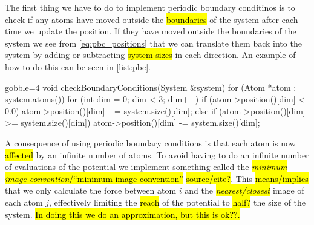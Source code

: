 The first thing we have to do to implement periodic boundary conditinos is to check if any atoms have moved outside the \hl{boundaries} of the system after each time we update the position. If they have moved outside the boundaries of the system we see from \cref{eq:pbc_positions} that we can translate them back into the system by adding or subtracting \hl{system sizes} in each direction. An example of how to do this can be seen in \cref{list:pbc}.
\begin{listing}[!htb]%
\begin{cppcode*}{gobble=4}
    void checkBoundaryConditions(System &system)
    {
        for (Atom *atom : system.atoms())
        {
            for (int dim = 0; dim < 3; dim++)
            {
                if (atom->position()[dim] < 0.0) 
                    atom->position()[dim] += system.size()[dim];
                else if (atom->position()[dim] >= system.size()[dim]) 
                    atom->position()[dim] -= system.size()[dim];
            }
        }
    }
\end{cppcode*}
\caption{%
    \texttt{checkBoundaryConditions}. \hl{assumes no more than one box outside...}%
    \label{list:pbc}%
}%
\end{listing}%

A consequence of using periodic boundary conditions is that each atom is now \hl{affected} by an infinite number of atoms. To avoid having to do an infinite number of evaluations of the potential we implement something called the \hl{\emph{minimum image convention}/``minimum image convention''} \hl{source/cite?}. This \hl{means/implies} that we only calculate the force between atom $i$ and the \hl{\emph{nearest/closest}} image of each atom $j$, effectively limiting the \hl{reach} of the potential to \hl{half?} the size of the system.  \hl{In doing this we do an approximation, but this is ok??.}

